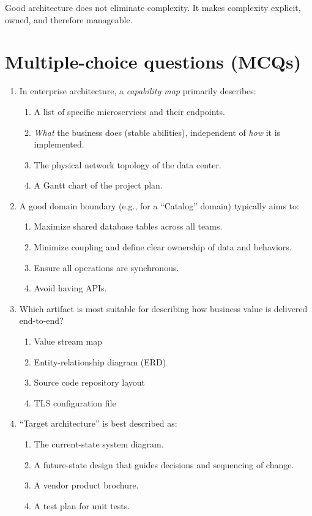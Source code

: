Good architecture does not eliminate complexity.
It makes complexity explicit, owned, and therefore manageable.

\section{Multiple-choice questions (MCQs)}
\begin{enumerate}
  \item In enterprise architecture, a \emph{capability map} primarily describes:
  \begin{enumerate}
    \item A list of specific microservices and their endpoints.
    \item \emph{What} the business does (stable abilities), independent of \emph{how} it is implemented.
    \item The physical network topology of the data center.
    \item A Gantt chart of the project plan.
  \end{enumerate}

  \item A good domain boundary (e.g., for a ``Catalog'' domain) typically aims to:
  \begin{enumerate}
    \item Maximize shared database tables across all teams.
    \item Minimize coupling and define clear ownership of data and behaviors.
    \item Ensure all operations are synchronous.
    \item Avoid having APIs.
  \end{enumerate}

  \item Which artifact is most suitable for describing how business value is delivered end-to-end?
  \begin{enumerate}
    \item Value stream map
    \item Entity-relationship diagram (ERD)
    \item Source code repository layout
    \item TLS configuration file
  \end{enumerate}

  \item ``Target architecture'' is best described as:
  \begin{enumerate}
    \item The current-state system diagram.
    \item A future-state design that guides decisions and sequencing of change.
    \item A vendor product brochure.
    \item A test plan for unit tests.
  \end{enumerate}


\end{enumerate}
